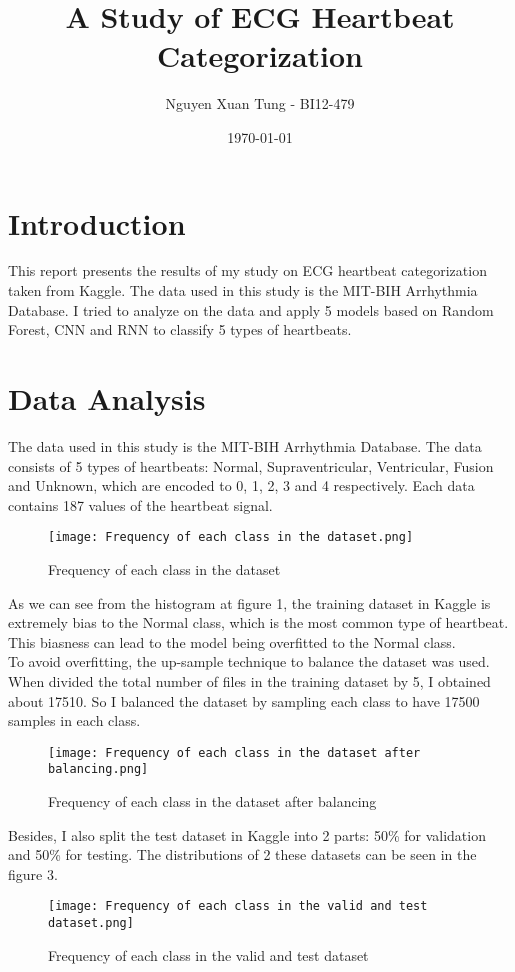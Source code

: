 \documentclass{article}
\title{A Study of ECG Heartbeat Categorization}
\author{Nguyen Xuan Tung - BI12-479}
\date{\today}
\begin{document}
\maketitle
\section{Introduction}

This report presents the results of my study on ECG heartbeat categorization taken from Kaggle. 
The data used in this study is the MIT-BIH Arrhythmia Database.
I tried to analyze on the data and apply 5 models based on Random Forest, CNN and RNN to classify 5 types of heartbeats. 

\section{Data Analysis}
The data used in this study is the MIT-BIH Arrhythmia Database.
The data consists of 5 types of heartbeats: Normal, Supraventricular, Ventricular, Fusion and Unknown, 
which are encoded to 0, 1, 2, 3 and 4 respectively. Each data contains 187 values of the heartbeat signal.\\ 

\begin{figure}[h]
\centering
\texttt{[image: Frequency of each class in the dataset.png]}
\caption{Frequency of each class in the dataset}
\end{figure}

\noindent As we can see from the histogram at figure 1,
the training dataset in Kaggle is extremely bias to
the Normal class, which is the most common type of heartbeat. 
This biasness can lead to the model being overfitted to the Normal class.\\


\noindent To avoid overfitting, the up-sample technique to balance the dataset was used.
When divided the total number of files in the training dataset by 5,
I obtained about 17510. So I balanced the dataset by sampling each class to have 17500 samples in each class.\\
\begin{figure}[h]
\centering
\texttt{[image: Frequency of each class in the dataset after balancing.png]}
\caption{Frequency of each class in the dataset after balancing}
\end{figure}

\noindent Besides, I also split the test dataset in Kaggle into 2 parts: 50\% for validation and 50\% for testing.
The distributions of 2 these datasets can be seen in the figure 3. \\
\begin{figure}[h]
\centering
\texttt{[image: Frequency of each class in the valid and test dataset.png]}
\caption{Frequency of each class in the valid and test dataset}
\end{figure}
    
\end{document}

